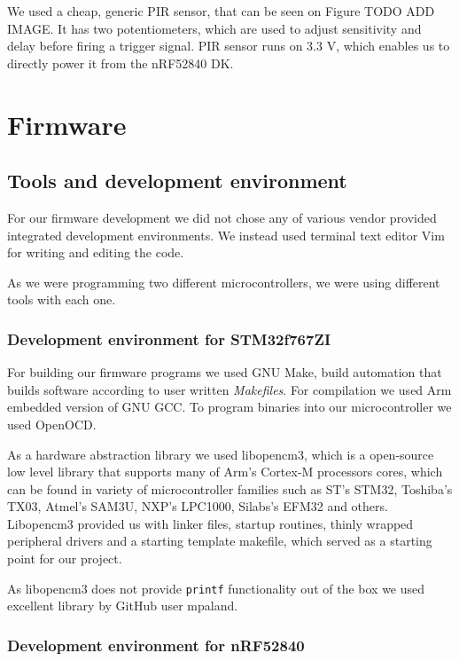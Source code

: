 We used a cheap, generic PIR sensor, that can be seen on Figure TODO ADD IMAGE.
It has two potentiometers, which are used to adjust sensitivity and delay before firing a trigger signal.
PIR sensor runs on 3.3 V, which enables us to directly power it from the nRF52840 DK. 



\section{ Firmware}
\subsection{ Tools and development environment}

For our firmware development we did not chose any of various vendor provided integrated development environments.
We instead used terminal text editor Vim for writing and editing the code.

As we were programming two different microcontrollers, we were using different tools with each one.


\subsubsection{ Development environment for STM32f767ZI}

For building our firmware programs we used GNU Make, build automation that builds software according to user written \textit{Makefiles}.
For compilation we used Arm embedded version of GNU GCC.
To program binaries into our microcontroller we used OpenOCD.

As a hardware abstraction library we used libopencm3, which is a open-source low level library that supports many of Arm's Cortex-M processors cores, which can be found in variety of microcontroller families such as ST's STM32, Toshiba's TX03, Atmel's SAM3U, NXP's LPC1000, Silabs's EFM32 and others.
Libopencm3 provided us with linker files, startup routines, thinly wrapped peripheral drivers and a starting template makefile, which served as a starting point for our project.

As libopencm3 does not provide \verb|printf| functionality out of the box we used excellent library by GitHub user mpaland\cite{printf_lib}.


\subsubsection{ Development environment for nRF52840}

